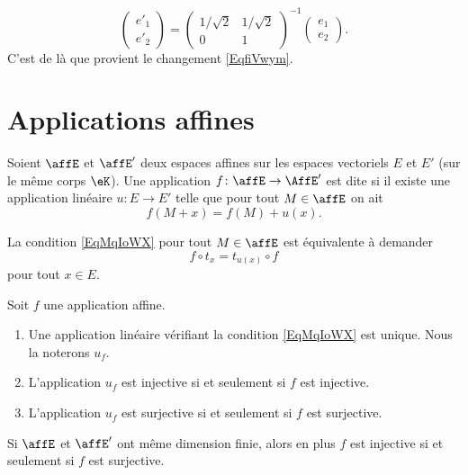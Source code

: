 \begin{example}
    \begin{equation}
        \begin{pmatrix}
            e'_1    \\ 
            e'_2    
        \end{pmatrix}=\begin{pmatrix}
            1/\sqrt{2}    &   1/\sqrt{2}    \\ 
            0    &   1    
        \end{pmatrix}^{-1}\begin{pmatrix}
            e_1    \\ 
            e_2    
        \end{pmatrix}.
    \end{equation}
    C'est de là que provient le changement \eqref{EqfiVwym}.
\end{example}

\section{Applications affines}

\begin{definition}
    Soient \( \affE\) et \( \affE'\) deux espaces affines sur les espaces vectoriels \( E\) et \( E'\) (sur le même corps \( \eK\)). Une application \( f\colon \affE\to \AffE'\) est dite  si il existe une application linéaire \( u\colon E\to E'\) telle que pour tout \( M\in\affE\) on ait
    \begin{equation}    \label{EqMqIoWX}
        f(M+x)=f(M)+u(x).
    \end{equation}
\end{definition}
\begin{remark}
    La condition \eqref{EqMqIoWX} pour tout \( M\in\affE\) est équivalente à demander 
    \begin{equation}
        f\circ t_x=t_{u(x)}\circ f
    \end{equation}
    pour tout \( x\in E\).
\end{remark}

\begin{proposition}
    Soit \( f\) une application affine.
    \begin{enumerate}
        \item
            Une application linéaire vérifiant la condition \eqref{EqMqIoWX} est unique. Nous la noterons \( u_f\).
        \item
            L'application \( u_f\) est injective si et seulement si \( f\) est injective.
        \item
            L'application \( u_f\) est surjective si et seulement si \( f\) est surjective.
    \end{enumerate}
    Si \( \affE\) et \( \affE'\) ont même dimension finie, alors en plus \( f\) est injective si et seulement si \( f\) est surjective.
\end{proposition}

